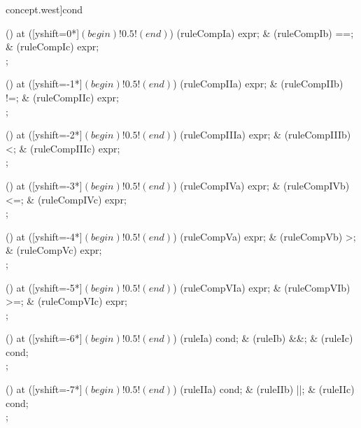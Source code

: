 \begin{syntax}[[xshift=16mm]concept.west]{cond}
  
  \node[sequence] () at ([yshift=0*\syntaxruledist]$(begin)!0.5!(end)$) {
    \node[nonterminal] (ruleCompIa) {expr};
    &
    \node[terminal]    (ruleCompIb) {==};
    &
    \node[nonterminal] (ruleCompIc) {expr};
    \\
  };
  
  \node[sequence] () at ([yshift=-1*\syntaxruledist]$(begin)!0.5!(end)$) {
    \node[nonterminal] (ruleCompIIa) {expr};
    &
    \node[terminal]    (ruleCompIIb) {!=};
    &
    \node[nonterminal] (ruleCompIIc) {expr};
    \\
  };
  
  \node[sequence] () at ([yshift=-2*\syntaxruledist]$(begin)!0.5!(end)$) {
    \node[nonterminal] (ruleCompIIIa) {expr};
    &
    \node[terminal]    (ruleCompIIIb) {<};
    &
    \node[nonterminal] (ruleCompIIIc) {expr};
    \\
  };
  
  \node[sequence] () at ([yshift=-3*\syntaxruledist]$(begin)!0.5!(end)$) {
    \node[nonterminal] (ruleCompIVa) {expr};
    &
    \node[terminal]    (ruleCompIVb) {<=};
    &
    \node[nonterminal] (ruleCompIVc) {expr};
    \\
  };
  
  \node[sequence] () at ([yshift=-4*\syntaxruledist]$(begin)!0.5!(end)$) {
    \node[nonterminal] (ruleCompVa) {expr};
    &
    \node[terminal]    (ruleCompVb) {>};
    &
    \node[nonterminal] (ruleCompVc) {expr};
    \\
  };
  
  \node[sequence] () at ([yshift=-5*\syntaxruledist]$(begin)!0.5!(end)$) {
    \node[nonterminal] (ruleCompVIa) {expr};
    &
    \node[terminal]    (ruleCompVIb) {>=};
    &
    \node[nonterminal] (ruleCompVIc) {expr};
    \\
  };
  
  \node[sequence] () at ([yshift=-6*\syntaxruledist]$(begin)!0.5!(end)$) {
    \node[nonterminal] (ruleIa) {cond};
    &
    \node[terminal]    (ruleIb) {\&\&};
    &
    \node[nonterminal] (ruleIc) {cond};
    \\
  };
  
  \node[sequence] () at ([yshift=-7*\syntaxruledist]$(begin)!0.5!(end)$) {
    \node[nonterminal] (ruleIIa) {cond};
    &
    \node[terminal]    (ruleIIb) {||};
    &
    \node[nonterminal] (ruleIIc) {cond};
    \\
  };
  

\end{syntax}
